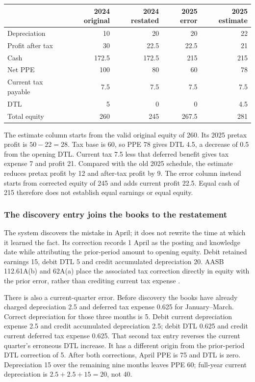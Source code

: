 \begin{center}
\small
\begin{tabular}{lrrrr}
\toprule
& 2024 original & 2024 restated & 2025 error & 2025 estimate\\
\midrule
Depreciation & 10 & 20 & 20 & 22\\
Profit after tax & 30 & 22.5 & 22.5 & 21\\
Cash & 172.5 & 172.5 & 215 & 215\\
Net PPE & 100 & 80 & 60 & 78\\
Current tax payable & 7.5 & 7.5 & 7.5 & 7.5\\
DTL & 5 & 0 & 0 & 4.5\\
Total equity & 260 & 245 & 267.5 & 281\\
\bottomrule
\end{tabular}
\end{center}

The estimate column starts from the valid original equity of 260. Its
2025 pretax profit is \(50-22=28\). Tax base is 60, so PPE 78 gives
DTL 4.5, a decrease of 0.5 from the opening DTL. Current tax 7.5 less
that deferred benefit gives tax expense 7 and profit 21. Compared with
the old 2025 schedule, the estimate reduces pretax profit by 12 and
after-tax profit by 9. The error column instead starts from corrected
equity of 245 and adds current profit 22.5. Equal cash of 215 therefore
does not establish equal earnings or equal equity.

\subsubsection{The discovery entry joins the books to the restatement}

The system discovers the mistake in April; it does not rewrite the time at
which it learned the fact. Its correction records 1 April as the posting
and knowledge date while attributing the prior-period amount to opening
equity. Debit retained earnings 15, debit DTL 5 and credit accumulated
depreciation 20. AASB 112.61A(b) and 62A(a) place the associated tax
correction directly in equity with the prior error, rather than crediting
current tax expense \citep{aasb112dated}.

There is also a current-quarter error. Before discovery the books have
already charged depreciation 2.5 and deferred tax expense 0.625 for
January--March. Correct depreciation for those three months is 5. Debit
current depreciation expense 2.5 and credit accumulated depreciation 2.5;
debit DTL 0.625 and credit current deferred tax expense 0.625. That
second tax entry reverses the current quarter's erroneous DTL increase.
It has a different origin from the prior-period DTL correction of 5.
After both corrections, April PPE is 75 and DTL is zero. Depreciation
15 over the remaining nine months leaves PPE 60; full-year current
depreciation is \(2.5+2.5+15=20\), not 40.

